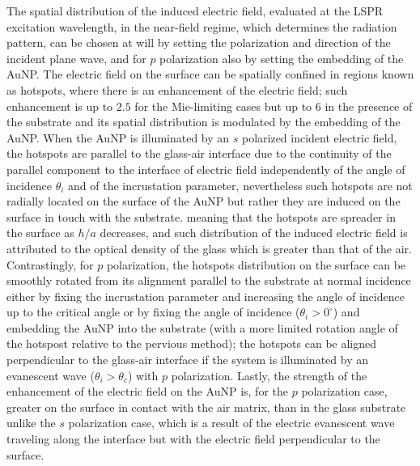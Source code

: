 The spatial distribution of the induced electric field, evaluated at the LSPR excitation wavelength, in the near-field regime, which determines the radiation pattern, can be chosen at will by setting the polarization and direction of the incident plane wave, and for $p$ polarization also by setting the embedding of the AuNP. The electric field on the surface can be spatially confined in regions known as hotspots, where there is an enhancement of the electric field; such enhancement is up to $2.5$ for the Mie-limiting cases but up to $6$ in the presence of the substrate and  its spatial distribution is modulated by the embedding of the AuNP. When the AuNP is illuminated by an $s$ polarized incident electric field, the hotspots are parallel to the glass-air interface due to the continuity of the parallel component to the interface of electric field independently of the angle of incidence $\theta_i$ and of the incrustation parameter, nevertheless such hotspots are not radially located on the surface of the AuNP but rather they are induced on the surface in touch with the substrate. meaning that the hotspots are spreader in the surface as $h/a$ decreases, and such distribution of the induced electric field is attributed to the optical density of the glass which is greater than that of the air. Contrastingly, for $p$ polarization, the hotspots distribution on the surface can be smoothly rotated from its alignment parallel to the substrate at normal incidence  either by fixing the incrustation parameter and increasing the angle of incidence up to the critical angle or by fixing the angle of incidence ($ \theta_i >0^\circ$) and embedding the AuNP into the substrate (with a more limited rotation angle of the hotspost relative to the pervious method); the hotspots can be aligned perpendicular to the glass-air interface if the system is illuminated by an evanescent wave ($\theta_i>\theta_c$) with $p$  polarization. Lastly, the strength of the enhancement of the electric field on the AuNP is, for the $p$ polarization case, greater on the surface in contact with the air matrix, than in the glass substrate unlike the $s$ polarization case, which is a result of the electric evanescent wave traveling along the interface but with the electric field perpendicular to the surface. 


